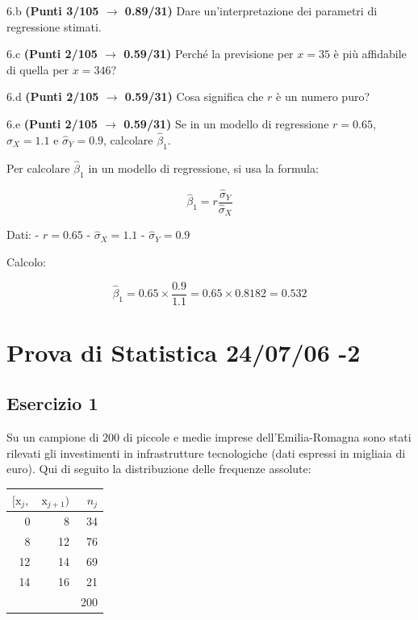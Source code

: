\documentclass[
  11pt,
]{book}
\theoremstyle{mytheoremstyle}
\theoremstyle{mydefstyle}
\newenvironment{sol}
  {
  \begin{tcolorbox}[enhanced,breakable,arc=0.1mm,boxrule=1pt,colback=white,colframe=iblue,
  title=\bf \fontfamily{lmss}\selectfont \hspace{.5 cm} Soluzione,drop fuzzy shadow]

}{
\end{tcolorbox}
  }
\begin{document}
6.b \textbf{(Punti 3/105 \(\rightarrow\) 0.89/31)} Dare un'interpretazione dei parametri di regressione stimati.

6.c \textbf{(Punti 2/105 \(\rightarrow\) 0.59/31)} Perché la previsione per \(x=35\) è più affidabile di quella per \(x=346\)?

6.d \textbf{(Punti 2/105 \(\rightarrow\) 0.59/31)} Cosa significa che \(r\) è un numero puro?

6.e \textbf{(Punti 2/105 \(\rightarrow\) 0.59/31)} Se in un modello di regressione \(r=0.65\), \(\hat\sigma_X=1.1\) e \(\hat\sigma_Y=0.9\), calcolare \(\hat\beta_1\).

\begin{sol}
Per calcolare \(\hat\beta_1\) in un modello di regressione, si usa la formula:

\[
\hat\beta_1 = r \frac{\hat\sigma_Y}{\hat\sigma_X}
\]

Dati:
- \(r = 0.65\)
- \(\hat\sigma_X = 1.1\)
- \(\hat\sigma_Y = 0.9\)

Calcolo:

\[
\hat\beta_1 = 0.65 \times \frac{0.9}{1.1} = 0.65 \times 0.8182 = 0.532
\]

\end{sol}

\section{Prova di Statistica 24/07/06 -2}\label{prova-di-statistica-240706--2}

\subsection{Esercizio 1}\label{esercizio-1-41}

Su un campione di \(200\) di piccole e medie imprese dell'Emilia-Romagna sono stati rilevati gli investimenti in infrastrutture tecnologiche (dati espressi in migliaia di euro). Qui di seguito la distribuzione delle frequenze assolute:

\begin{table}[H]
\centering
\begin{tabular}{rrr}
\toprule
$[\text{x}_j,$ & $\text{x}_{j+1})$ & $n_j$\\
\midrule
0 & 8 & 34\\
8 & 12 & 76\\
12 & 14 & 69\\
14 & 16 & 21\\
 &  & 200\\
\bottomrule
\end{tabular}
\end{table}
\end{document}
